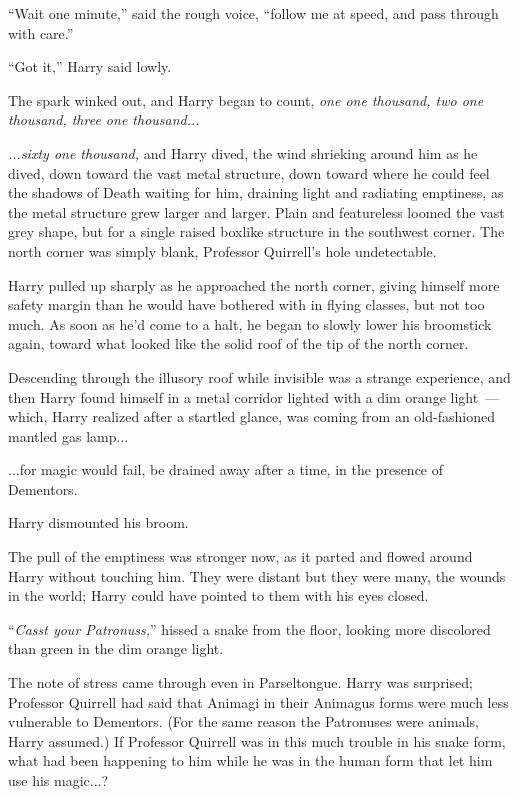 ``Wait one minute,'' said the rough voice, ``follow me at speed, and pass through with care.''

``Got it,'' Harry said lowly.

The spark winked out, and Harry began to count, \emph{one one thousand, two one thousand, three one thousand...}

\emph{...sixty one thousand,} and Harry dived, the wind shrieking around him as he dived, down toward the vast metal structure, down toward where he could feel the shadows of Death waiting for him, draining light and radiating emptiness, as the metal structure grew larger and larger. Plain and featureless loomed the vast grey shape, but for a single raised boxlike structure in the southwest corner. The north corner was simply blank, Professor Quirrell's hole undetectable.

Harry pulled up sharply as he approached the north corner, giving himself more safety margin than he would have bothered with in flying classes, but not too much. As soon as he'd come to a halt, he began to slowly lower his broomstick again, toward what looked like the solid roof of the tip of the north corner.

Descending through the illusory roof while invisible was a strange experience, and then Harry found himself in a metal corridor lighted with a dim orange light~--- which, Harry realized after a startled glance, was coming from an old-fashioned mantled gas lamp...

...for magic would fail, be drained away after a time, in the presence of Dementors.

Harry dismounted his broom.

The pull of the emptiness was stronger now, as it parted and flowed around Harry without touching him. They were distant but they were many, the wounds in the world; Harry could have pointed to them with his eyes closed.

``\emph{Casst your Patronuss,}'' hissed a snake from the floor, looking more discolored than green in the dim orange light.

The note of stress came through even in Parseltongue. Harry was surprised; Professor Quirrell had said that Animagi in their Animagus forms were much less vulnerable to Dementors. (For the same reason the Patronuses were animals, Harry assumed.) If Professor Quirrell was in this much trouble in his snake form, what had been happening to him while he was in the human form that let him use his magic...?

